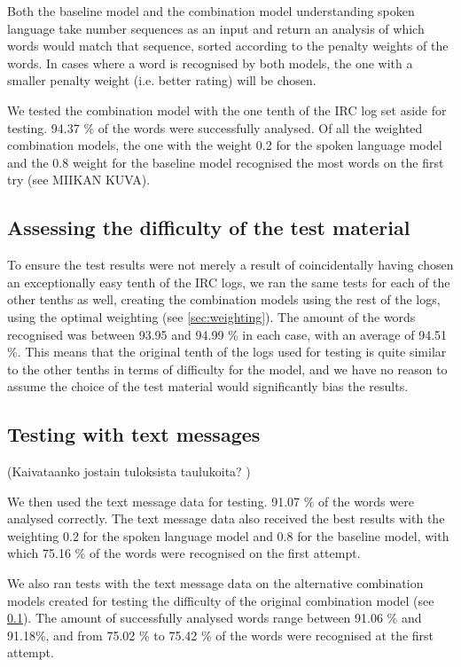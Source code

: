 \documentclass[a4paper,conference]{IEEEtran}
\begin{document}
Both the baseline model and the combination model understanding spoken language take number sequences as an input and return an analysis of which words would match that sequence, sorted according to the penalty weights of the words. In cases where a word is recognised by both models, the one with a smaller penalty weight (i.e. better rating) will be chosen.

We tested the combination model with the one tenth of the IRC log set aside for testing. 94.37 \% of the words were successfully analysed. Of all the weighted combination models, the one with the weight 0.2 for the spoken language model and the 0.8 weight for the baseline model recognised the most words on the first try (see MIIKAN KUVA).

\subsection{Assessing the difficulty of the test material}
\label{sec:difficulty}
To ensure the test results were not merely a result of coincidentally having chosen an exceptionally easy tenth of the IRC logs, we ran the same tests for each of the other tenths as well, creating the combination models using the rest of the logs, using the optimal weighting (see \ref{sec:weighting}). The amount of the words recognised was between 93.95 and 94.99 \% in each case, with an average of 94.51 \%. This means that the original tenth of the logs used for testing is quite similar to the other tenths in terms of difficulty for the model, and we have no reason to assume the choice of the test material would significantly bias the results.

\subsection{Testing with text messages}

(Kaivataanko jostain tuloksista taulukoita? )
 
We then used the text message data for testing. 91.07 \% of the words were analysed correctly. The text message data also received the best results with the weighting 0.2 for the spoken language model and 0.8 for the baseline model, with which 75.16 \% of the words were recognised on the first attempt.

We also ran tests with the text message data on the alternative combination models created for testing the difficulty of the original combination model (see \ref{sec:difficulty}). The amount of successfully analysed words range between 91.06 \% and 91.18\%, and from 75.02 \% to 75.42 \% of the words were recognised at the first attempt. 
\end{document}
